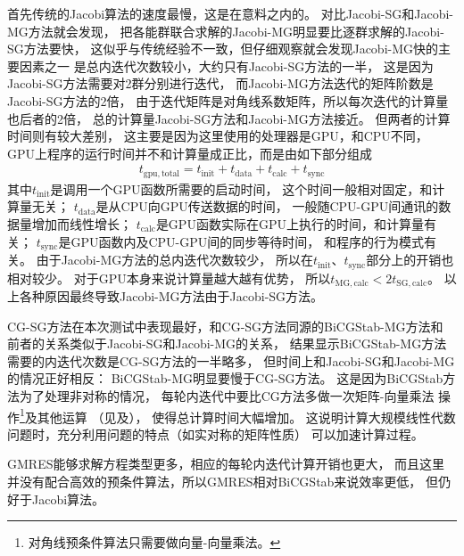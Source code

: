 首先传统的Jacobi算法的速度最慢，这是在意料之内的。
对比Jacobi-SG和Jacobi-MG方法就会发现，
把各能群联合求解的Jacobi-MG明显要比逐群求解的Jacobi-SG方法要快，
这似乎与传统经验不一致，但仔细观察就会发现Jacobi-MG快的主要因素之一
是总内迭代次数较小，大约只有Jacobi-SG方法的一半，
这是因为Jacobi-SG方法需要对2群分别进行迭代，
而Jacobi-MG方法迭代的矩阵阶数是Jacobi-SG方法的2倍，
由于迭代矩阵是对角线系数矩阵，所以每次迭代的计算量也后者的2倍，
总的计算量Jacobi-SG方法和Jacobi-MG方法接近。
但两者的计算时间则有较大差别，
这主要是因为这里使用的处理器是GPU，和CPU不同，
GPU上程序的运行时间并不和计算量成正比，而是由如下部分组成
\begin{align}
  t_\mathrm{gpu,total} = t_\mathrm{init} + t_\mathrm{data} + t_\mathrm{calc} + t_\mathrm{sync}
\end{align}
其中$t_\mathrm{init}$是调用一个GPU函数所需要的启动时间，
这个时间一般相对固定，和计算量无关；
$t_\mathrm{data}$是从CPU向GPU传送数据的时间，
一般随CPU-GPU间通讯的数据量增加而线性增长；
$t_\mathrm{calc}$是GPU函数实际在GPU上执行的时间，和计算量有关；
$t_\mathrm{sync}$是GPU函数内及CPU-GPU间的同步等待时间，
和程序的行为模式有关。
由于Jacobi-MG方法的总内迭代次数较少，
所以在$t_\mathrm{init}$、$t_\mathrm{sync}$部分上的开销也相对较少。
对于GPU本身来说计算量越大越有优势，
所以$t_\mathrm{MG,calc}<2t_\mathrm{SG,calc}$。
以上各种原因最终导致Jacobi-MG方法由于Jacobi-SG方法。

CG-SG方法在本次测试中表现最好，和CG-SG方法同源的BiCGStab-MG方法和
前者的关系类似于Jacobi-SG和Jacobi-MG的关系，
结果显示BiCGStab-MG方法需要的内迭代次数是CG-SG方法的一半略多，
但时间上和Jacobi-SG和Jacobi-MG的情况正好相反：
BiCGStab-MG明显要慢于CG-SG方法。
这是因为BiCGStab方法为了处理非对称的情况，
每轮内迭代中要比CG方法多做一次矩阵-向量乘法
操作\footnote{对角线预条件算法只需要做向量-向量乘法。}及其他运算
（见及），
使得总计算时间大幅增加。
这说明计算大规模线性代数问题时，充分利用问题的特点（如实对称的矩阵性质）
可以加速计算过程。

GMRES能够求解方程类型更多，相应的每轮内迭代计算开销也更大，
而且这里并没有配合高效的预条件算法，所以GMRES相对BiCGStab来说效率更低，
但仍好于Jacobi算法。

